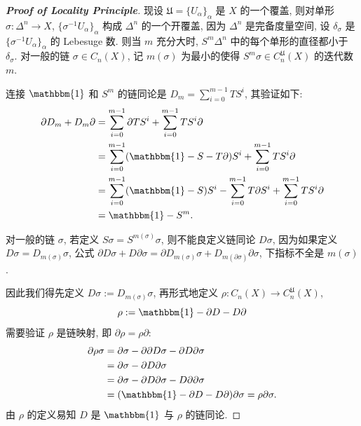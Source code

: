 \begin{proof}[{\bf Proof of Locality Principle}]
        现设 $\mathfrak{U}=\{U_{\alpha}\}_{\alpha}$ 是 $X$ 的一个覆盖, 则对单形 $\sigma:\Delta^n\rightarrow X$, $\{\sigma^{-1}U_{\alpha}\}_{\alpha}$ 构成 $\Delta^n$ 的一个开覆盖, 
        因为 $\Delta^n$ 是完备度量空间, 设 $\delta_\sigma$ 是 $\{\sigma^{-1}U_{\alpha}\}_{\alpha}$ 的 Lebesuge 数. 则当 $m$ 充分大时, $S^m\Delta^n$ 中的每个单形的直径都小于 $\delta_\sigma$.
        对一般的链 $\sigma\in C_n(X)$, 记 $m(\sigma)$ 为最小的使得 $S^m\sigma\in C^{\mathfrak{U}}_n(X)$ 的迭代数 $m$.

        连接 $\mathbbm{1}$ 和 $S^m$ 的链同论是 $D_m=\sum\limits_{i=0}^{m-1}TS^i$, 其验证如下:
        \begin{align*}
            \partial D_m + D_m\partial &= \sum_{i=0}^{m-1}\partial TS^i + \sum_{i=0}^{m-1}TS^i\partial \\
            &= \sum_{i=0}^{m-1}(\mathbbm{1} - S - T\partial)S^i + \sum_{i=0}^{m-1}TS^i\partial \\
            &= \sum_{i=0}^{m-1}(\mathbbm{1} - S)S^i - \sum_{i=0}^{m-1}T\partial S^i + \sum_{i=0}^{m-1}TS^i\partial \\
            &= \mathbbm{1} - S^m.
        \end{align*}
        
        对一般的链 $\sigma$, 若定义 $S\sigma = S^{m(\sigma)}\sigma$, 则不能良定义链同论 $D\sigma$, 因为如果定义 $D\sigma = D_{m(\sigma)}\sigma$, 
        公式 $\partial D\sigma+D\partial\sigma = \partial D_{m(\sigma)}\sigma+D_{m(\partial\sigma)}\partial\sigma$, 下指标不全是 $m(\sigma)$. 
            
        因此我们得先定义 $D\sigma := D_{m(\sigma)}\sigma$, 再形式地定义 $\rho:C_n(X)\rightarrow C^{\mathfrak{U}}_n(X)$, 
        \begin{equation*}
            \rho := \mathbbm{1} - \partial D - D\partial
        \end{equation*}
        需要验证 $\rho$ 是链映射, 即 $\partial\rho=\rho\partial$:
        \begin{align*}
            \partial\rho\sigma &= \partial\sigma - \partial\partial D\sigma - \partial D\partial\sigma \\
            &= \partial\sigma - \partial D\partial\sigma \\
            &= \partial\sigma - \partial D\partial\sigma - D\partial\partial\sigma \\
            &= (\mathbbm{1} - \partial D - D\partial)\partial\sigma = \rho\partial\sigma.
        \end{align*}
        由 $\rho$ 的定义易知 $D$ 是 $\mathbbm{1}$ 与 $\rho$ 的链同论.


\end{proof}
